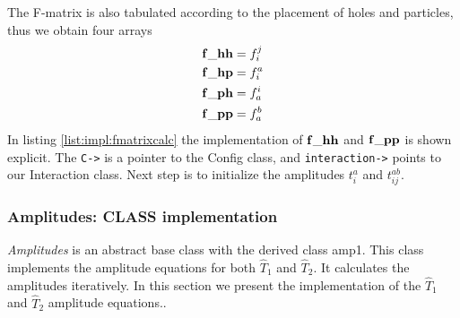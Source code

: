 The F-matrix is also tabulated according to the placement of holes and particles, thus we obtain four arrays
 \begin{align}  
{\bf f\_{hh}}&=f_{i}^{j}\nonumber\\
{\bf f\_{hp}}&=f_{i}^{a}\nonumber\\
{\bf f\_{ph}}&=f_{a}^{i}\nonumber\\
{\bf f\_{pp}}&=f_{a}^{b}
\label{eq:impl:fmatrices}
\end{align}
In listing \ref{list:impl:fmatrixcalc} the implementation of ${\bf f\_{hh}}$ and ${\bf f\_{pp}}$ is shown explicit. The \texttt{C->} is a pointer to the Config class, and \texttt{interaction->} points to our Interaction class. Next step is to initialize the amplitudes $t_i^a$ and $t_{ij}^{ab}$.
%
\subsubsection{ Amplitudes: CLASS implementation}
\emph{Amplitudes} is an abstract base class with the derived class amp1. This class implements the amplitude equations for both $\hat{T}_1$ and $\hat{T}_2$. It calculates the amplitudes iteratively. In this section we present the implementation of the $\hat{T}_1$ and $\hat{T}_2$ amplitude equations.. 
%
